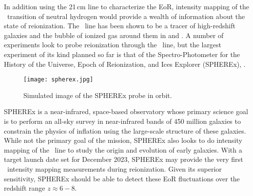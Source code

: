 In addition using the 21\,cm line to characterize the EoR, intensity mapping of the
\lya\ transition of neutral hydrogen would provide a wealth of information about
the state of reionization. The \lya\ line has been shown to be a tracer of high-redshift
galaxies and the bubble of ionized gas around them in \cite{2013ApJ...763..132S} and \cite{2014ApJ...786..111P}.
A number of experiments look to probe reionization through the \lya\ line, but the
largest experiment of its kind planned so far is that of the Spectro-Photometer
for the History of the Universe, Epoch of Reionization, and Ices Explorer (SPHEREx),
\cite{2014arXiv1412.4872D}.

\begin{figure}[th]
	\centering
	\texttt{[image: spherex.jpg]}
	\caption[SPHEREx Instrument]{Simulated image of the SPHEREx probe in orbit.}
	\label{fig:spherex}
\end{figure}

SPHEREx is a near-infrared, space-based observatory whose primary science goal is to perform
an all-sky survey in near-infrared bands of 450 million galaxies to constrain the
physics of inflation using the large-scale structure of these galaxies. While not
the primary goal of the mission, SPHEREx also looks to do intensity mapping of the
\lya\ line to study the origin and evolution of early galaxies. With a target launch
date set for December 2023, SPHEREx may provide the very first \lya\ intensity mapping
measurements during reionization. Given its superior sensitivity, SPHEREx should
be able to detect these EoR fluctuations over the redshift range $z \approx 6 - 8$.
